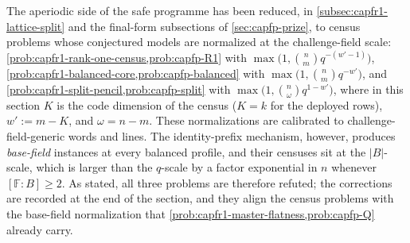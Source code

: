 \documentclass[11pt]{article}
\theoremstyle{definition}
\theoremstyle{remark}
\newcommand{\F}{\mathbb{F}}
\newcommand{\B}{B}
\begin{document}
The aperiodic side of the safe programme has been reduced, in
\cref{subsec:capfr1-lattice-split} and the final-form subsections of
\cref{sec:capfp-prize}, to census problems whose conjectured models are
normalized at the challenge-field scale:
\cref{prob:capfr1-rank-one-census,prob:capfp-R1} with
$\max\bigl(1,\binom nmq^{-(w'-1)}\bigr)$,
\cref{prob:capfr1-balanced-core,prob:capfp-balanced} with
$\max\bigl(1,\binom nmq^{-w'}\bigr)$, and
\cref{prob:capfr1-split-pencil,prob:capfp-split} with
$\max\bigl(1,\binom n\omega q^{1-w'}\bigr)$, where in this section
$K$ is the code dimension of the census ($K=k$ for the deployed rows),
$w':=m-K$, and $\omega=n-m$.  These normalizations are calibrated to
challenge-field-generic words and lines.  The identity-prefix mechanism,
however, produces \emph{base-field} instances at every balanced profile,
and their censuses sit at the $|\B|$-scale, which is larger than the
$q$-scale by a factor exponential in $n$ whenever $[\F:\B]\ge2$.  As
stated, all three problems are therefore refuted; the corrections are
recorded at the end of the section, and they align the census problems
with the base-field normalization that
\cref{prob:capfr1-master-flatness,prob:capfp-Q} already carry.
\end{document}
